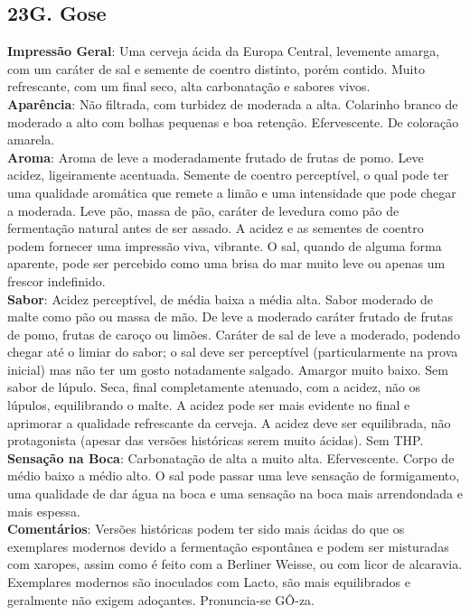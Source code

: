 \subsection*{23G. Gose}
\textbf{Impressão Geral}: Uma cerveja ácida da Europa Central, levemente amarga, com um caráter de sal e semente de coentro distinto, porém contido. Muito refrescante, com um final seco, alta carbonatação e sabores vivos. \\
\textbf{Aparência}: Não filtrada, com turbidez de moderada a alta. Colarinho branco de moderado a alto com bolhas pequenas e boa retenção. Efervescente. De coloração amarela. \\
\textbf{Aroma}: Aroma de leve a moderadamente frutado de frutas de pomo. Leve acidez, ligeiramente acentuada. Semente de coentro perceptível, o qual pode ter uma qualidade aromática que remete a limão e uma intensidade que pode chegar a moderada. Leve pão, massa de pão, caráter de levedura como pão de fermentação natural antes de ser assado. A acidez e as sementes de coentro podem fornecer uma impressão viva, vibrante. O sal, quando de alguma forma aparente, pode ser percebido como uma brisa do mar muito leve ou apenas um frescor indefinido. \\
\textbf{Sabor}: Acidez perceptível, de média baixa a média alta. Sabor moderado de malte como pão ou massa de mão. De leve a moderado caráter frutado de frutas de pomo, frutas de caroço ou limões. Caráter de sal de leve a moderado, podendo chegar até o limiar do sabor; o sal deve ser perceptível (particularmente na prova inicial) mas não ter um gosto notadamente salgado. Amargor muito baixo. Sem sabor de lúpulo. Seca, final completamente atenuado, com a acidez, não  os lúpulos, equilibrando o malte. A acidez pode ser mais evidente no final e aprimorar a qualidade refrescante da cerveja. A acidez deve ser equilibrada, não protagonista (apesar das versões históricas serem muito ácidas). Sem THP. \\
\textbf{Sensação na Boca}: Carbonatação de alta a muito alta. Efervescente. Corpo de médio baixo a médio alto. O sal pode passar uma leve sensação de formigamento, uma qualidade de dar água na boca e uma sensação na boca mais arrendondada e mais espessa. \\
\textbf{Comentários}: Versões históricas podem ter sido mais ácidas do que os exemplares modernos devido a fermentação espontânea e podem ser misturadas com xaropes, assim como é feito com a Berliner Weisse, ou com licor de alcaravia. Exemplares modernos são inoculados com Lacto, são mais equilibrados e geralmente não exigem adoçantes. Pronuncia-se GÔ-za. \\
